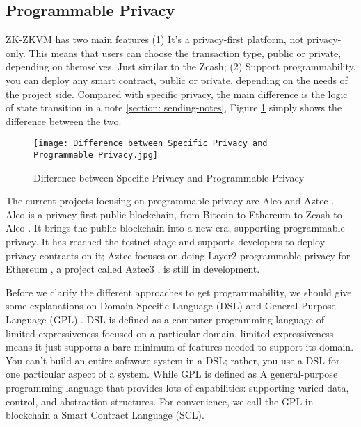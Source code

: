 \subsection{Programmable Privacy}

ZK-ZKVM has two main features (1) It's a privacy-first platform, not privacy-only. This means that users can 
choose the transaction type, public or private, depending on themselves. Just similar to the Zcash\cite{website:Zcash}; 
(2) Support programmability, you can deploy any smart contract, public or 
private, depending on the needs of the project side. Compared with specific 
privacy, the main difference is the logic of state transition in a note \ref{section: sending-notes}, Figure \ref{fig:Difference between Specific Privacy and Programmable Privacy} simply shows the difference 
between the two.
\begin{figure}[!ht]
    \centering
    \texttt{[image: Difference between Specific Privacy and Programmable Privacy.jpg]}
    \caption{Difference between Specific Privacy and Programmable Privacy}
    \label{fig:Difference between Specific Privacy and Programmable Privacy}
\end{figure}

The current projects focusing on programmable privacy are Aleo \cite{website:Aleo} and Aztec \cite{website:Aztec}. Aleo \cite{website:Aleo} is a 
privacy-first public blockchain, from Bitcoin \cite{website:BTC} to Ethereum \cite{website:Ethereum} to Zcash \cite{website:Zcash} to Aleo \cite{website:Aleo}. It brings the public blockchain into a new era,
supporting programmable privacy. 
It has reached the testnet stage and supports developers to deploy privacy contracts on it; 
Aztec \cite{website:Aztec} focuses on doing Layer2 programmable privacy for Ethereum \cite{website:Ethereum}, a project 
called Aztec3 \cite{website:Aztec3}, is still in development.

Before we clarify the different approaches to get programmability, we should give some explanations on Domain Specific Language (DSL) \cite{website:DSL} and General Purpose Language (GPL) \cite{website:DSL}.
DSL \cite{website:DSL} is defined as a computer programming language of limited expressiveness focused on a particular domain, limited expressiveness means it just supports a bare minimum of features 
needed to support its domain. You can't build an entire software system in a DSL; rather, you use a DSL \cite{website:DSL} for one particular aspect of a system. While GPL \cite{website:DSL} is defined as A general-purpose programming language
that provides lots of capabilities: supporting varied data, control, and abstraction structures. For convenience, we call the GPL in blockchain a Smart Contract Language (SCL).

